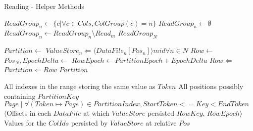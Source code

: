 \documentclass[fleqn]{article}
\begin{document}
\begin{algorithm}
\scriptsize
\caption{Reading - Helper Methods}
\begin{algorithmic}[2]
\State $ReadGroup_{n} \gets \{ c | \forall c \in Cols, ColGroup(c) = n\}$
 \State $ReadGroup_{n} \gets \emptyset$
\EndWhile
{}
 \State $ReadGroup_{n} \gets ReadGroup_{n} \setminus Read_{m}$
\EndWhile
\Return $ReadGroup_N$
\EndFunction
\Statex

\State $Partition \gets $ 
\State $ValueStore_n \Leftarrow \langle DataFile_n[Pos_n] \rangle mid \forall n \in N$
 \State $Row \gets $ 
 \State $Pos_N, EpochDelta \gets$ 
 \State $RowEpoch \gets PartitionEpoch + EpochDelta$
  \State $Row \Leftarrow $ 
 \EndFor
 \State $Partition \Leftarrow Row$
\EndFor
\Return $Partition$
\EndFunction

\Statex
{}
\State \Return All indexes in the range storing the same value as $Token$
\EndFunction
\Statex
{}
\State \Return All positions possibly containing $PartitionKey$
\EndFunction
\Statex
{}
\State \Return ${Page \mid \forall (Token \mapsto Page) \in PartitionIndex, StartToken <= Key < EndToken }$
\EndFunction
\Statex
{}
\State \Return $\langle$Offsets in each $DataFile$ at which $ValueStore$ persisted $RowKey$, $RowEpoch \rangle$
\EndFunction
\Statex
{}
\State \Return Values for the $ColIds$ persisted by $ValueStore$ at relative $Pos$
\EndFunction

\end{algorithmic}
\end{algorithm}

\clearpage
\end{document}
